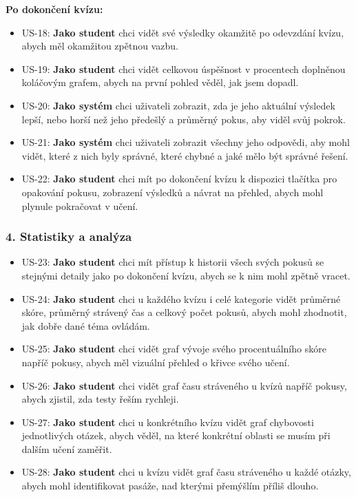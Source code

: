 \documentclass{vskpou} %
\begin{document}
\textbf{Po dokončení kvízu:}
\begin{itemize}
    \item US-18: \textbf{Jako student} chci vidět své výsledky okamžitě po odevzdání kvízu, abych měl okamžitou zpětnou vazbu.
    \item US-19: \textbf{Jako student} chci vidět celkovou úspěšnost v procentech doplněnou koláčovým grafem, abych na první pohled věděl, jak jsem dopadl.
    \item US-20: \textbf{Jako systém} chci uživateli zobrazit, zda je jeho aktuální výsledek lepší, nebo horší než jeho předešlý a průměrný pokus, aby viděl svůj pokrok.
    \item US-21: \textbf{Jako systém} chci uživateli zobrazit všechny jeho odpovědi, aby mohl vidět, které z nich byly správné, které chybné a jaké mělo být správné řešení.
    \item US-22: \textbf{Jako student} chci mít po dokončení kvízu k dispozici tlačítka pro opakování pokusu, zobrazení výsledků a návrat na přehled, abych mohl plynule pokračovat v učení.
\end{itemize}

\subsubsection*{4. Statistiky a analýza}
\begin{itemize}
    \item US-23: \textbf{Jako student} chci mít přístup k historii všech svých pokusů se stejnými detaily jako po dokončení kvízu, abych se k nim mohl zpětně vracet.
    \item US-24: \textbf{Jako student} chci u každého kvízu i celé kategorie vidět průměrné skóre, průměrný strávený čas a celkový počet pokusů, abych mohl zhodnotit, jak dobře dané téma ovládám.
    \item US-25: \textbf{Jako student} chci vidět graf vývoje svého procentuálního skóre napříč pokusy, abych měl vizuální přehled o křivce svého učení.
    \item US-26: \textbf{Jako student} chci vidět graf času stráveného u kvízů napříč pokusy, abych zjistil, zda testy řeším rychleji.
    \item US-27: \textbf{Jako student} chci u konkrétního kvízu vidět graf chybovosti jednotlivých otázek, abych věděl, na které konkrétní oblasti se musím při dalším učení zaměřit.
    \item US-28: \textbf{Jako student} chci u kvízu vidět graf času stráveného u každé otázky, abych mohl identifikovat pasáže, nad kterými přemýšlím příliš dlouho.
\end{itemize}
\end{document}
